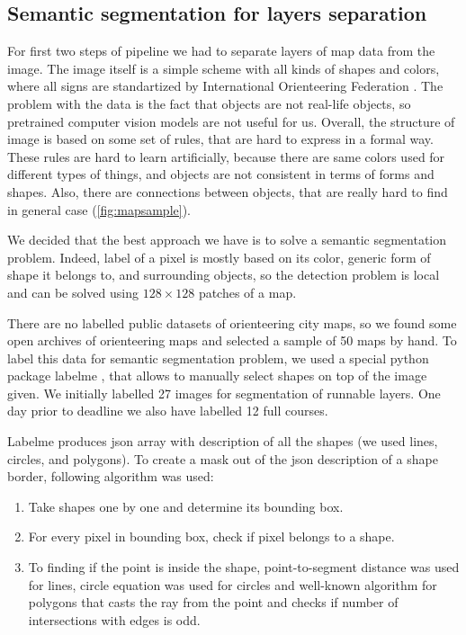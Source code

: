 \documentclass[a4paper,12pt]{extarticle}
\begin{document}
\subsection{Semantic segmentation for layers separation}

For first two steps of pipeline we had to separate layers of map data from the image.
The image itself is a simple scheme with all kinds of shapes and colors, where all signs are standartized by International Orienteering Federation \cite{iof}.
The problem with the data is the fact that objects are not real-life objects, so pretrained computer vision models are not useful for us.
Overall, the structure of image is based on some set of rules, that are hard to express in a formal way.
These rules are hard to learn artificially, because there are same colors used for different types of things, and objects are not consistent in terms of forms and shapes.
Also, there are connections between objects, that are really hard to find in general case (\cref{fig:mapsample}).

We decided that the best approach we have is to solve a semantic segmentation problem.
Indeed, label of a pixel is mostly based on its color, generic form of shape it belongs to, and surrounding objects, so the detection problem is local and can be solved using $128 \times 128$ patches of a map.

There are no labelled public datasets of orienteering city maps, so we found some open archives of orienteering maps and selected a sample of 50 maps by hand.
To label this data for semantic segmentation problem, we used a special python package labelme \cite{labelme}, that allows to manually select shapes on top of the image given.
We initially labelled 27 images for segmentation of runnable layers. One day prior to deadline we also have labelled 12 full courses.

Labelme produces json array with description of all the shapes (we used lines, circles, and polygons).
To create a mask out of the json description of a shape border, following algorithm was used:
\begin{enumerate}
    \item Take shapes one by one and determine its bounding box.
    \item For every pixel in bounding box, check if pixel belongs to a shape.
    \item To finding if the point is inside the shape, point-to-segment distance was used for lines, circle equation was used for circles and well-known algorithm for polygons \cite{pipproblem} that casts the ray from the point and checks if number of intersections with edges is odd.
\end{enumerate}
\end{document}
